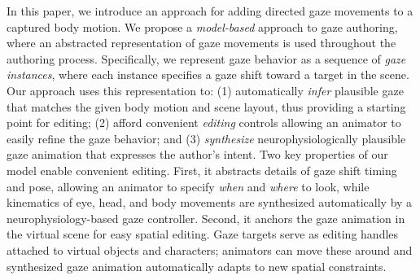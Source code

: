 In this paper, we introduce an approach for adding directed gaze movements to a captured body motion. We propose a \emph{model-based} approach to gaze authoring, where an abstracted representation of gaze movements is used throughout the authoring process. Specifically, we represent gaze behavior as a sequence of \emph{gaze instances}, where each instance specifies a gaze shift toward a target in the scene. Our approach uses this representation to: (1) automatically \emph{infer} plausible gaze that matches the given body motion and scene layout, thus providing a starting point for editing; (2) afford convenient \emph{editing} controls allowing an animator to easily refine the gaze behavior; and (3) \emph{synthesize} neurophysiologically plausible gaze animation that expresses the author's intent. Two key properties of our model enable convenient editing. First, it abstracts details of gaze shift timing and pose, allowing an animator to specify \emph{when} and \emph{where} to look, while kinematics of eye, head, and body movements are synthesized automatically by a neurophysiology-based gaze controller. Second, it anchors the gaze animation in the virtual scene for easy spatial editing. Gaze targets serve as editing handles attached to virtual objects and characters; animators can move these around and synthesized gaze animation automatically adapts to new spatial constraints.%

